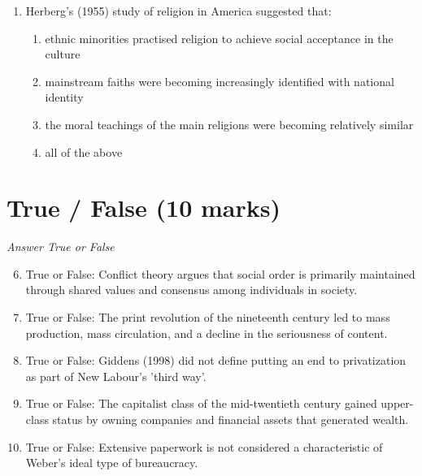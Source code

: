 \documentclass[12pt]{article}
\begin{document}
\begin{enumerate}[label=\arabic*.]
\begin{enumerate}[label=(\alph*)]
    \item the most commonly used recreational drug is Ecstasy
    \item teenage girls are more likely to experiment with hard drugs than teenage boys
    \item despite a series of moral panics, the use of illegal drugs is very rare
\end{enumerate}
\item Herberg's (1955) study of religion in America suggested that:
\begin{enumerate}[label=(\alph*)]
    \item ethnic minorities practised religion to achieve social acceptance in the culture
    \item mainstream faiths were becoming increasingly identified with national identity
    \item the moral teachings of the main religions were becoming relatively similar
    \item all of the above
\end{enumerate}
\end{enumerate}

\section*{True / False (10 marks)}
\textit{Answer True or False}
\begin{enumerate}[label=\arabic*.]
\setcounter{enumi}{5}
\item True or False: Conflict theory argues that social order is primarily maintained through shared values and consensus among individuals in society.
\item True or False: The print revolution of the nineteenth century led to mass production, mass circulation, and a decline in the seriousness of content.
\item True or False: Giddens (1998) did not define putting an end to privatization as part of New Labour's 'third way'.
\item True or False: The capitalist class of the mid-twentieth century gained upper-class status by owning companies and financial assets that generated wealth.
\item True or False: Extensive paperwork is not considered a characteristic of Weber's ideal type of bureaucracy.
\end{enumerate}
\end{document}
